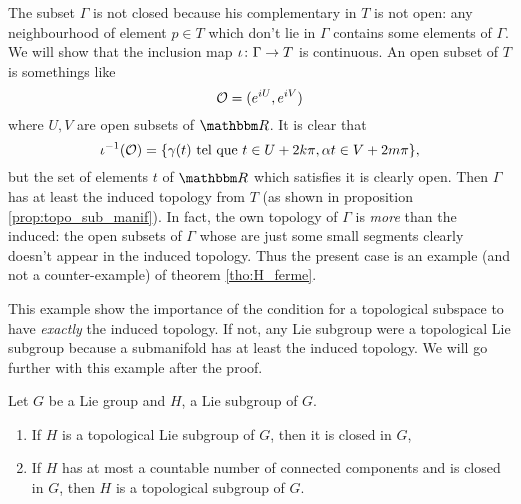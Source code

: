 The subset $\Gamma$ is not closed because his complementary in $T$ is not open: any neighbourhood of element $p\in T$ which don't lie in $\Gamma$ contains some elements of $\Gamma$. We will show that the inclusion map $\iota\colon \Gamma\to T$ is continuous. An open subset of $T$ is somethings like
\[
  \mathcal{O}=(e^{iU},e^{iV})
\]
where $U,V$ are open subsets of $\eR$. It is clear that 
\[
   \iota^{-1}(\mathcal{O})=\{ \gamma(t)\text{ tel que } t\in U+2k\pi,\alpha t\in V+2m\pi \},
\]
but the set of elements $t$ of $\eR$ which satisfies it is clearly open. Then $\Gamma$ has at least the induced topology from $T$ (as shown in proposition \ref{prop:topo_sub_manif}). In fact, the own topology of $\Gamma$ is \emph{more} than the induced: the open subsets of $\Gamma$ whose are just some small segments clearly doesn't appear in the induced topology. Thus the present case is an example (and not a counter-example) of theorem \ref{tho:H_ferme}.

This example show the importance of the condition for a topological subspace to have \emph{exactly} the induced topology. If not, any Lie subgroup were a topological Lie subgroup because a submanifold has at least the induced topology. We will go further with this example after the proof.


\begin{theorem} 
Let $G$ be a Lie group and $H$, a Lie subgroup of $G$.
\begin{enumerate}
\item If $H$ is a topological Lie subgroup of $G$, then it is closed in $G$,
\item If $H$ has at most a countable number of connected components and is closed in $G$, then $H$ is a topological subgroup of $G$.
\end{enumerate}
\label{tho:H_ferme}
\end{theorem}

